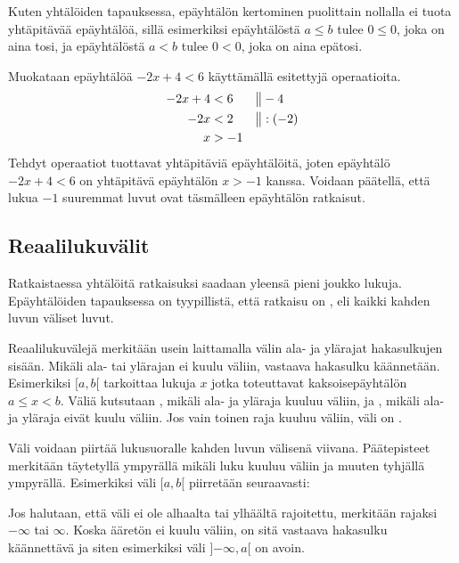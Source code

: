 Kuten yhtälöiden tapauksessa, epäyhtälön kertominen puolittain nollalla ei tuota yhtäpitävää epäyhtälöä, sillä esimerkiksi epäyhtälöstä $a \leq b$ tulee $0 \leq 0$, joka on aina tosi, ja epäyhtälöstä $a < b$ tulee $0 < 0$, joka on aina epätosi.

\begin{esimerkki}
Muokataan epäyhtälöä $-2x+4<6$ käyttämällä esitettyjä operaatioita.
\begin{align*}
-2x+4&<6 && \big\| -4 \\
-2x&<2 && \big\| :(-2) \\
x&>-1
\end{align*}
Tehdyt operaatiot tuottavat yhtäpitäviä epäyhtälöitä, joten epäyhtälö $-2x+4<6$ on yhtäpitävä epäyhtälön $x>-1$ kanssa. Voidaan päätellä, että lukua $-1$ suuremmat luvut ovat täsmälleen epäyhtälön ratkaisut.
\end{esimerkki}

\subsection*{Reaalilukuvälit}

Ratkaistaessa yhtälöitä ratkaisuksi saadaan yleensä pieni joukko lukuja. Epäyhtälöiden tapauksessa on tyypillistä, että ratkaisu on , eli kaikki kahden luvun väliset luvut.

Reaalilukuvälejä merkitään usein laittamalla välin ala- ja ylärajat hakasulkujen sisään. Mikäli ala- tai ylärajan ei kuulu väliin, vastaava hakasulku käännetään. Esimerkiksi $[a, b[$ tarkoittaa lukuja $x$ jotka toteuttavat kaksoisepäyhtälön $a \leq x < b$. Väliä kutsutaan , mikäli ala- ja yläraja kuuluu väliin, ja , mikäli ala- ja yläraja eivät kuulu väliin. Jos vain toinen raja kuuluu väliin, väli on .

Väli voidaan piirtää lukusuoralle kahden luvun välisenä viivana. Päätepisteet merkitään täytetyllä ympyrällä mikäli luku kuuluu väliin ja muuten tyhjällä ympyrällä. Esimerkiksi väli $[a, b[$ piirretään seuraavasti:

\begin{lukusuora}{0}{10}{6}
\end{lukusuora}

Jos halutaan, että väli ei ole alhaalta tai ylhäältä rajoitettu, merkitään rajaksi $-\infty$ tai $\infty$. Koska ääretön ei kuulu väliin, on sitä vastaava hakasulku käännettävä ja siten esimerkiksi väli $]{-\infty}, a[$ on avoin. 


